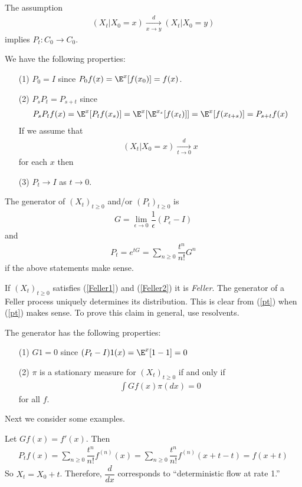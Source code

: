 \begin{note}
The assumption
\begin{align}
\label{Feller1}
(X_t | X_0 = x) \xrightarrow[x \to y]{d} (X_t | X_0 =y) 
\end{align}
implies $P_t: C_0 \to C_0$.
\end{note}

We have the following properties: 
\begin{enumerate}
\item[(1)] $P_0 = I$ since $P_0 f(x) = \E^{x} [f(x_0)] = f(x)$. 
\item[(2)] $P_s P_t = P_{s + t}$
since
$$\begin{aligned}
P_s P_t f(x) = \E^{x}[P_t f(x_s) ] = \E^{x} [ \E^{x_s} [ f(x_t) ] ] 
= \E^{x} [ f(x_{t+s})]  
=  P_{s+t} f(x)
\end{aligned}$$
If we assume that
\begin{align}
\label{Feller2}
(X_t | X_0 = x) \xrightarrow[t \to 0]{d} x
\end{align}
for each $x$ then
\item[(3)] $P_t \to I$ as $t \to 0$. 
\end{enumerate}

\begin{defn}
The generator of $(X_t)_{t \geq 0}$ and/or $(P_t)_{t \geq 0}$ is
$$\begin{aligned}
G = \lim_{\epsilon \to 0} \dfrac{1}{\epsilon} (P_{\epsilon} - I)
\end{aligned}$$
and 
\begin{align}
\label{pt}
P_t = e^{tG} = \sum_{n \geq 0} \dfrac{t^{n}}{n!} G^n
\end{align}
if the above statements make sense. 
\end{defn}

\begin{note}
If $(X_t)_{t \geq 0}$ satisfies (\ref{Feller1}) and (\ref{Feller2}) it is {\em Feller}.
The generator of a Feller process uniquely determines its distribution. This is clear from (\ref{pt})
when (\ref{pt}) makes sense. To prove this claim in general, use resolvents. 
\end{note}
The generator has the following properties:
\begin{enumerate}
\item[(1)] $G1 = 0$ since $(P_t - I)1(x) = \E^{x}[1 - 1] = 0$
\item[(2)] $\pi$ is a stationary measure for $(X_t)_{t \geq 0}$ if and only if 
$$\begin{aligned}
\int G f(x) \pi (dx) = 0
\end{aligned}$$
for all $f$. 
\end{enumerate}
Next we consider some examples. 
\begin{exmp}
Let $Gf(x) = f'(x)$. Then 
$$\begin{aligned}
P_t f(x) =  \sum_{n \geq 0} \dfrac{t^{n}}{n!} f^{(n)}(x) =  \sum_{n \geq 0} \dfrac{t^{n}}{n!} f^{(n)}(x + t - t) =  f(x+t)
\end{aligned}$$
So $X_t = X_0 + t$. Therefore, $\dfrac{d}{dx}$ corresponds to ``deterministic flow at rate 1.''
\end{exmp}

